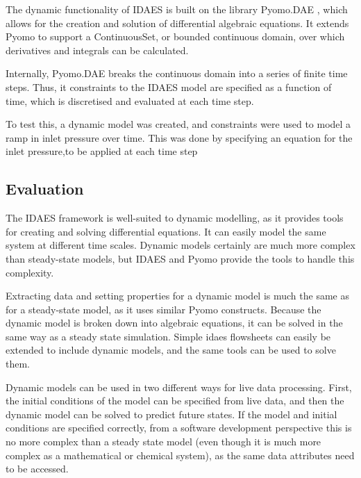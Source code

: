 \documentclass[12pt]{article}
\begin{document}

The dynamic functionality of IDAES is built on the library Pyomo.DAE \cite{nicholson2018pyomo}, which allows for the creation and solution of differential algebraic equations. It extends Pyomo to support a ContinuousSet, or bounded continuous domain, over which derivatives and integrals can be calculated. 

Internally, Pyomo.DAE breaks the continuous domain into a series of finite time steps. Thus, it constraints to the IDAES model are specified as a function of time, which is discretised and evaluated at each time step.

To test this, a dynamic model was created, and constraints were used to model a ramp in inlet pressure over time. This was done by specifying an equation for the inlet pressure,to be applied at each time step

\subsection{Evaluation}
The IDAES framework is well-suited to dynamic modelling, as it provides tools for creating and solving differential equations. It can easily model the same system at different time scales. Dynamic models certainly are much more complex than steady-state models, but IDAES and Pyomo provide the tools to handle this complexity.

Extracting data and setting properties for a dynamic model is much the same as for a steady-state model, as it uses similar Pyomo constructs. Because the dynamic model is broken down into algebraic equations, it can be solved in the same way as a steady state simulation. Simple idaes flowsheets can easily be extended to include dynamic models, and the same tools can be used to solve them. 

Dynamic models can be used in two different ways for live data processing. First, the initial conditions of the model can be specified from live data, and then the dynamic model can be solved to predict future states. If the model and initial conditions are specified correctly, from a software development perspective this is no more complex than a steady state model (even though it is much more complex as a mathematical or chemical system), as the same data attributes need to be accessed. 
\end{document}
